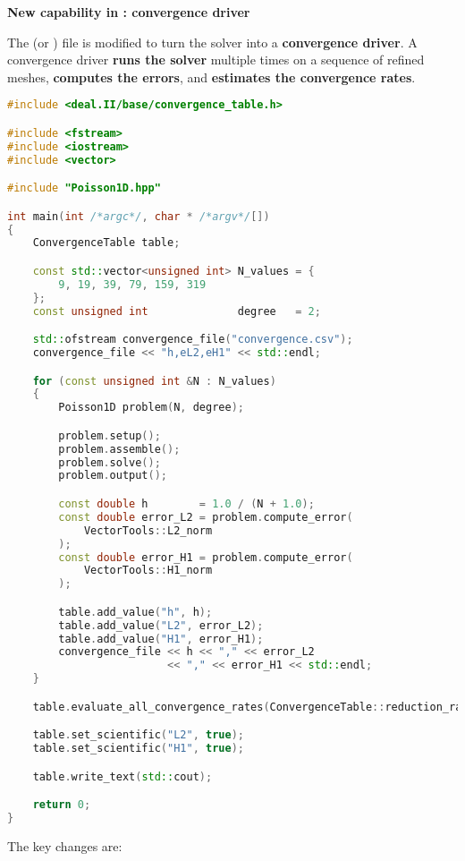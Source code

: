 \begin{flushleft}
    \textcolor{Green3}{ \textbf{New capability in : convergence driver}}
\end{flushleft}
The  (or ) file is modified to turn the solver into a \textbf{convergence driver}. A convergence driver \textbf{runs the solver} multiple times on a sequence of refined meshes, \textbf{computes the errors}, and \textbf{estimates the convergence rates}.
\begin{lstlisting}[language=C++, caption={\code{main.cpp} for convergence analysis}]
#include <deal.II/base/convergence_table.h>

#include <fstream>
#include <iostream>
#include <vector>

#include "Poisson1D.hpp"

int main(int /*argc*/, char * /*argv*/[])
{
    ConvergenceTable table;

    const std::vector<unsigned int> N_values = {
        9, 19, 39, 79, 159, 319
    };
    const unsigned int              degree   = 2;

    std::ofstream convergence_file("convergence.csv");
    convergence_file << "h,eL2,eH1" << std::endl;

    for (const unsigned int &N : N_values)
    {
        Poisson1D problem(N, degree);

        problem.setup();
        problem.assemble();
        problem.solve();
        problem.output();

        const double h        = 1.0 / (N + 1.0);
        const double error_L2 = problem.compute_error(
            VectorTools::L2_norm
        );
        const double error_H1 = problem.compute_error(
            VectorTools::H1_norm
        );

        table.add_value("h", h);
        table.add_value("L2", error_L2);
        table.add_value("H1", error_H1);
        convergence_file << h << "," << error_L2
                         << "," << error_H1 << std::endl;
    }

    table.evaluate_all_convergence_rates(ConvergenceTable::reduction_rate_log2);

    table.set_scientific("L2", true);
    table.set_scientific("H1", true);

    table.write_text(std::cout);

    return 0;
}\end{lstlisting}
The key changes are:
